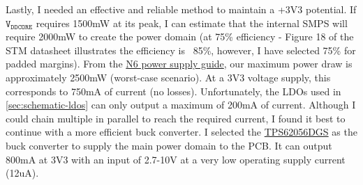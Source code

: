 \documentclass[10pt]{article}
\newcommand{\nl}{\newline \newline}
\begin{document}
\nl
Lastly, I needed an effective and reliable method to maintain a +3V3 potential. If $\texttt{V}_{\texttt{DDCORE}}$ requires 1500mW at its peak, I can estimate that the internal SMPS will require 2000mW to create the power domain (at 75\% efficiency - Figure 18 of the STM datasheet illustrates the efficiency is ~85\%, however, I have selected 75\% for padded margins).
From the \href{https://www.st.com/resource/en/application_note/an6000-how-to-build-the-discrete-power-supply-for-stm32n6-mcus-stmicroelectronics.pdf}{N6 power supply guide}, our maximum power draw is approximately 2500mW (worst-case scenario).
At a 3V3 voltage supply, this corresponds to 750mA of current (no losses). Unfortunately, the LDOs used in \autoref{sec:schematic-ldos} can only output a maximum of 200mA of current. Although I could chain multiple in parallel to reach the required current, I found it best to continue with a more efficient buck converter.
I selected the \href{https://au.mouser.com/ProductDetail/Texas-Instruments/TPS62056DGS?qs=sGAEpiMZZMvAX9OfPh%252B2NdYypUYwsctEmJ%252Bpz3ULnU8%3D}{TPS62056DGS} as the buck converter to supply the main power domain to the PCB. It can output 800mA at 3V3 with an input of 2.7-10V at a very low operating supply current (12uA).

\end{document}
